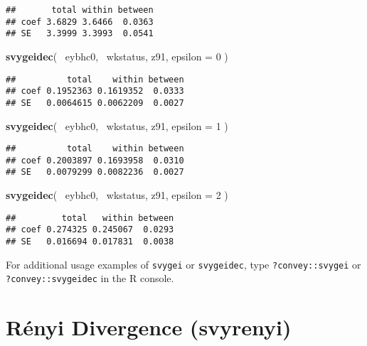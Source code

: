 \documentclass[]{book}
\newenvironment{Shaded}{\begin{snugshade}}{\end{snugshade}}
\newcommand{\KeywordTok}[1]{\textcolor[rgb]{0.13,0.29,0.53}{\textbf{{#1}}}}
\newcommand{\DataTypeTok}[1]{\textcolor[rgb]{0.13,0.29,0.53}{{#1}}}
\newcommand{\DecValTok}[1]{\textcolor[rgb]{0.00,0.00,0.81}{{#1}}}
\newcommand{\NormalTok}[1]{{#1}}
\begin{document}
\begin{verbatim}
##       total within between
## coef 3.6829 3.6466  0.0363
## SE   3.3999 3.3993  0.0541
\end{verbatim}

\begin{Shaded}
\begin{Highlighting}[]
\KeywordTok{svygeidec}\NormalTok{( ~eybhc0, ~wkstatus, z91, }\DataTypeTok{epsilon =} \DecValTok{0} \NormalTok{)}
\end{Highlighting}
\end{Shaded}

\begin{verbatim}
##          total    within between
## coef 0.1952363 0.1619352  0.0333
## SE   0.0064615 0.0062209  0.0027
\end{verbatim}

\begin{Shaded}
\begin{Highlighting}[]
\KeywordTok{svygeidec}\NormalTok{( ~eybhc0, ~wkstatus, z91, }\DataTypeTok{epsilon =} \DecValTok{1} \NormalTok{)}
\end{Highlighting}
\end{Shaded}

\begin{verbatim}
##          total    within between
## coef 0.2003897 0.1693958  0.0310
## SE   0.0079299 0.0082236  0.0027
\end{verbatim}

\begin{Shaded}
\begin{Highlighting}[]
\KeywordTok{svygeidec}\NormalTok{( ~eybhc0, ~wkstatus, z91, }\DataTypeTok{epsilon =} \DecValTok{2} \NormalTok{)}
\end{Highlighting}
\end{Shaded}

\begin{verbatim}
##         total   within between
## coef 0.274325 0.245067  0.0293
## SE   0.016694 0.017831  0.0038
\end{verbatim}

For additional usage examples of \texttt{svygei} or \texttt{svygeidec},
type \texttt{?convey::svygei} or \texttt{?convey::svygeidec} in the R
console.

\section{Rényi Divergence (svyrenyi)}\label{renyi-divergence-svyrenyi}
\end{document}
